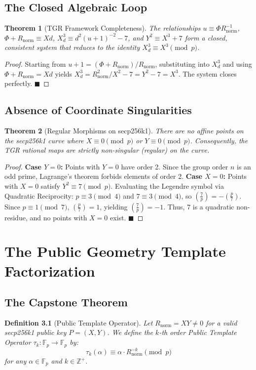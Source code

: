 \documentclass[11pt, a4paper, twoside]{book}
\newtheorem{theorem}{Theorem}[chapter]
\newtheorem{definition}[theorem]{Definition}
\begin{document}
\section{The Closed Algebraic Loop}
\begin{theorem}[TGR Framework Completeness]
The relationships $u \equiv \Phi R_{\text{norm}}^{-1}$, $\Phi + R_{\text{norm}} \equiv Xd$, $X_d^3 \equiv d^2(u+1)^{-2} - 7$, and $Y^2 \equiv X^3 + 7$ form a closed, consistent system that reduces to the identity $X_d^3 \equiv X^3 \pmod p$.
\end{theorem}
\begin{proof}
Starting from $u+1 = (\Phi + R_{\text{norm}})/R_{\text{norm}}$, substituting into $X_d^3$ and using $\Phi + R_{\text{norm}} = Xd$ yields $X_d^3 = R_{\text{norm}}^2/X^2 - 7 = Y^2 - 7 = X^3$. The system closes perfectly. $\blacksquare$
\end{proof}

\section{Absence of Coordinate Singularities}
\begin{theorem}[Regular Morphisms on secp256k1]
There are no affine points on the secp256k1 curve where $X \equiv 0 \pmod p$ or $Y \equiv 0 \pmod p$. Consequently, the TGR rational maps are strictly non-singular (regular) on the curve.
\end{theorem}
\begin{proof}
\textbf{Case $Y=0$:} Points with $Y=0$ have order 2. Since the group order $n$ is an odd prime, Lagrange's theorem forbids elements of order 2.
\textbf{Case $X=0$:} Points with $X=0$ satisfy $Y^2 \equiv 7 \pmod p$. Evaluating the Legendre symbol via Quadratic Reciprocity: $p \equiv 3 \pmod 4$ and $7 \equiv 3 \pmod 4$, so $\left(\frac{7}{p}\right) = -\left(\frac{p}{7}\right)$. Since $p \equiv 1 \pmod 7$, $\left(\frac{p}{7}\right) = 1$, yielding $\left(\frac{7}{p}\right) = -1$. Thus, 7 is a quadratic non-residue, and no points with $X=0$ exist. $\blacksquare$
\end{proof}

\chapter{The Public Geometry Template Factorization}

\section{The Capstone Theorem}
\begin{definition}[Public Template Operator]
Let $R_{\text{norm}} = XY \neq 0$ for a valid secp256k1 public key $P = (X, Y)$. We define the $k$-th order Public Template Operator $\tau_k : \mathbb{F}_p \to \mathbb{F}_p$ by:
\begin{equation}
    \tau_k(\alpha) \equiv \alpha \cdot R_{\text{norm}}^{-k} \pmod p
\end{equation}
for any $\alpha \in \mathbb{F}_p$ and $k \in \mathbb{Z}^+$.
\end{definition}
\end{document}

